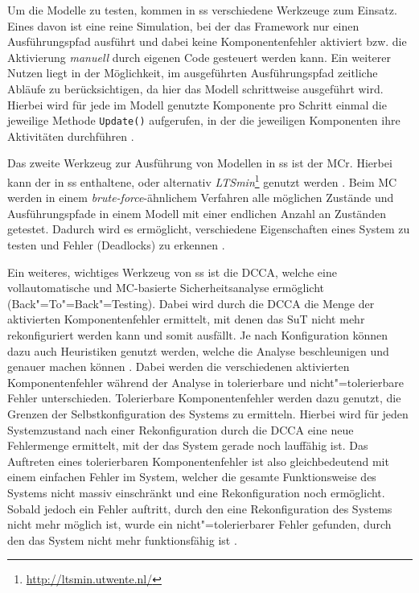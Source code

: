 Um die Modelle zu testen, kommen in \gls{ss} verschiedene Werkzeuge zum Einsatz.
Eines davon ist eine reine Simulation, bei der das Framework nur einen Ausführungspfad ausführt und dabei keine Komponentenfehler aktiviert bzw. die Aktivierung \textit{manuell} durch eigenen Code gesteuert werden kann.
Ein weiterer Nutzen liegt in der Möglichkeit, im ausgeführten Ausführungspfad zeitliche Abläufe zu berücksichtigen, da hier das Modell schrittweise ausgeführt wird.
Hierbei wird für jede im Modell genutzte Komponente pro Schritt einmal die jeweilige Methode \texttt{Update()} aufgerufen, in der die jeweiligen Komponenten ihre Aktivitäten durchführen \cite{Habermaier2016}.

Das zweite Werkzeug zur Ausführung von Modellen in \gls{ss} ist der \gls{MCr}.
Hierbei kann der in \gls{ss} enthaltene, oder alternativ \emph{LTSmin}\footnote{\url{http://ltsmin.utwente.nl/}} genutzt werden \cite{SSWikiModelChecking,Habermaier2016}.
Beim \gls{MC} werden in einem \emph{brute-force}-ähnlichem Verfahren alle möglichen Zustände und Ausführungspfade in einem Modell mit einer endlichen Anzahl an Zuständen getestet.
Dadurch wird es ermöglicht, verschiedene Eigenschaften eines System zu testen und Fehler (\zB Deadlocks) zu erkennen \cite{Grumberg1999}.

Ein weiteres, wichtiges Werkzeug von \gls{ss} ist die \gls{DCCA}, welche eine vollautomatische und \gls{MC}-basierte Sicherheitsanalyse ermöglicht (Back"=To"=Back"=Testing).
Dabei wird durch die \gls{DCCA} die Menge der aktivierten Komponentenfehler ermittelt, mit denen das \gls{SuT} nicht mehr rekonfiguriert werden kann und somit ausfällt.
Je nach Konfiguration können dazu auch Heuristiken genutzt werden, welche die Analyse beschleunigen und genauer machen können \cite{Eberhardinger2016}.
Dabei werden die verschiedenen aktivierten Komponentenfehler während der Analyse in tolerierbare und nicht"=tolerierbare Fehler unterschieden.
Tolerierbare Komponentenfehler werden dazu genutzt, die Grenzen der Selbstkonfiguration des Systems zu ermitteln.
Hierbei wird für jeden Systemzustand nach einer Rekonfiguration durch die \gls{DCCA} eine neue Fehlermenge ermittelt, mit der das System gerade noch lauffähig ist.
Das Auftreten eines tolerierbaren Komponentenfehler ist also gleichbedeutend mit einem einfachen Fehler im System, welcher die gesamte Funktionsweise des Systems nicht massiv einschränkt und eine Rekonfiguration noch ermöglicht.
Sobald jedoch ein Fehler auftritt, durch den eine Rekonfiguration des Systems nicht mehr möglich ist, wurde ein nicht"=tolerierbarer Fehler gefunden, durch den das System nicht mehr funktionsfähig ist \cite{Habermaier2015}.
